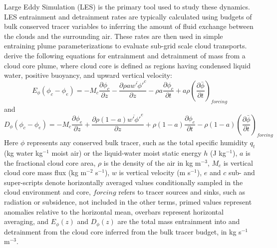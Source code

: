 \documentclass[12pt]{article}
\begin{document}
Large Eddy Simulation (LES) is the primary tool used to study these dynamics.  
LES entrainment and detrainment rates are typically calculated using budgets of 
bulk conserved tracer variables to inferring the amount of fluid exchange 
between the clouds and the surrounding air.  These rates are then used in 
simple entraining plume parameterizations to evaluate sub-grid scale cloud 
transports.  \cite{Siebesma1995} derive the following equations for 
entrainment and detrainment of mass from a cloud core plume, where cloud core 
is defined as regions having condensed liquid water, positive buoyancy, and 
upward vertical velocity:
\begin{equation}
  \label{eq:siebesma_entrainment}
    E_{\phi}(\phi_c - \phi_e) = - M_c \frac{\partial \phi_c}{\partial z}
        - \frac{\partial \rho a \overline{w' \phi'}^c}{\partial z}
        - \rho a \frac{\partial \phi_c}{\partial t}
        + a \rho \left(\frac{\partial \bar{\phi}}{\partial t}\right)_{forcing}
\end{equation}
and
\begin{equation}
  \label{eq:siebesma_detrainment}
    D_{\phi}(\phi_c - \phi_e) = - M_c \frac{\partial \phi_e}{\partial z}
        + \frac{\partial \rho (1 - a) \overline{w' \phi'}^e}{\partial z}
        + \rho (1-a) \frac{\partial \phi_e}{\partial t}
     - \rho (1-a) \left(\frac{\partial \bar{\phi}}{\partial t}\right)_{forcing}
\end{equation}
Here $\phi$ represents any conserved bulk tracer, such as the total specific 
humidity $q_t$ (kg water kg$^{-1}$ moist air) or the liquid-water moist static 
energy $h$ (J kg$^{-1}$), $a$ is the fractional cloud core area, $\rho$ is the 
density of the air in kg m$^{-3}$, $M_c$ is vertical cloud core mass flux 
(kg m$^{-2}$ s$^{-1}$), $w$ is vertical velocity (m s$^{-1}$), $e$ and $c$ sub- 
and super-scripts denote horizontally averaged values conditionally sampled in 
the cloud environment and core, $forcing$ refers to tracer sources and sinks,
such as radiation or subsidence, not included in the other terms, primed values 
represent anomalies relative to the horizontal mean, overbars represent 
horizontal averaging, and $E_{\phi}(z)$ and $D_{\phi}(z)$ are the total mass
entrainment into and detrainment from the cloud core inferred from the bulk tracer 
budget, in kg s$^{-1}$ m$^{-3}$.  
\end{document}
